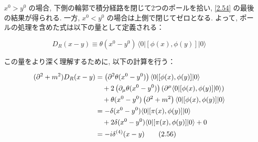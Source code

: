 \documentclass[a4paper,12pt]{article}
\begin{document}
\color{black}

$x^0 > y^0$ の場合, 下側の輪郭で積分経路を閉じて2つのポールを拾い, \eqref{2.54} の最後の結果が得られる. 一方, $x^0 < y^0$ の場合は上側で閉じてゼロとなる. よって, ポールの処理を含めた式は以下の量として定義される：

\begin{equation*}
D_R(x - y) \equiv \theta(x^0 - y^0)\, \langle 0 | [\phi(x), \phi(y)] | 0 \rangle \tag{2.55}
\end{equation*}

この量をより深く理解するために, 以下の計算を行う：

\begin{align*}
(\partial^2 + m^2) D_R(x - y) &= \left( \partial^2 \theta(x^0 - y^0) \right) \langle 0 | [\phi(x), \phi(y)] | 0 \rangle \notag \\
&\quad + 2 \left( \partial_\mu \theta(x^0 - y^0) \right) \left( \partial^\mu \langle 0 | [\phi(x), \phi(y)] | 0 \rangle \right) \notag \\
&\quad + \theta(x^0 - y^0) \left( \partial^2 + m^2 \right) \langle 0 | [\phi(x), \phi(y)] | 0 \rangle \notag \\
&= -\delta(x^0 - y^0) \langle 0 | [\pi(x), \phi(y)] | 0 \rangle \notag \\
&\quad + 2\delta(x^0 - y^0) \langle 0 | [\pi(x), \phi(y)] | 0 \rangle + 0 \notag \\
&= -i\delta^{(4)}(x - y) \label{2.56}\tag{2.56}
\end{align*}
\end{document}
